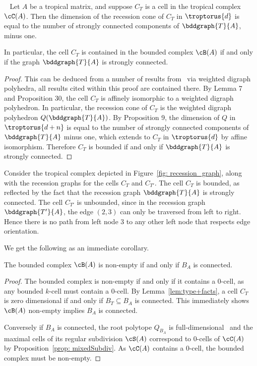\begin{prop}\label{prop:bounded+graph}~\cite{JoswigLoho:2016}
Let $A$ be a tropical matrix, and suppose $C_T$ is a cell in the tropical complex $\cC(A)$.
Then the dimension of the recession cone of $C_T$ in $\troptorus{d}$ is equal to the number of strongly connected components of $\bddgraph{T}{A}$, minus one.

In particular, the cell $C_T$ is contained in the bounded complex $\cB(A)$ if and only if the graph $\bddgraph{T}{A}$ is strongly connected.
\end{prop}
\begin{proof}
This can be deduced from a number of results from~\cite{JoswigLoho:2016} via weighted digraph polyhedra, all results cited within this proof are contained there.
By Lemma 7 and Proposition 30, the cell $C_T$ is affinely isomorphic to a weighted digraph polyhedron.
In particular, the recession cone of $C_T$ is the weighted digraph polyhedron $Q(\bddgraph{T}{A})$.
By Proposition 9, the dimension of $Q$ in $\troptorus{d+n}$ is equal to the number of strongly connected components of $\bddgraph{T}{A}$ minus one, which extends to $C_T$ in $\troptorus{d}$ by affine isomorphism.
Therefore $C_T$ is bounded if and only if $\bddgraph{T}{A}$ is strongly connected.
\end{proof}


\begin{example}\label{ex: recession_graph}
Consider the tropical complex depicted in Figure~\ref{fig: recession_graph}, along with the recession graphs for the cells $C_T$ and $C_{T'}$.
The cell $C_{T}$ is bounded, as reflected by the fact that the recession graph $\bddgraph{T}{A}$ is strongly connected.
The cell $C_{T'}$ is unbounded, since in the recession graph $\bddgraph{T'}{A}$, the edge $(2,3)$ can only be traversed from left to right. Hence there is no path from left node $3$ to any other left node that respects edge orientation.
\end{example}

We get the following as an immediate corollary.

\begin{cor}\label{prop: bdd_complex_nonempty}
The bounded complex $\cB(A)$ is non-empty if and only if $B_A$ is connected.
\end{cor}
\begin{proof}
The bounded complex is non-empty if and only if it contains a 0-cell, as any bounded $k$-cell must contain a 0-cell.
By Lemma~\ref{lem:type+facts}, a cell $C_T$ is zero dimensional if and only if $B_T\subseteq B_A$ is connected.
This immediately shows $\cB(A)$ non-empty implies $B_A$ is connected.

Conversely if $B_A$ is connected, the root polytope $Q_{B_A}$ is full-dimensional~\cite[Lemma 12.5]{postnikov2009permutohedra} and the maximal cells of its regular subdivision $\cS(A)$ correspond to 0-cells of $\cC(A)$ by Proposition~\ref{prop: mixedSubdiv}.
As $\cC(A)$ contains a 0-cell, the bounded complex must be non-empty.
\end{proof}

